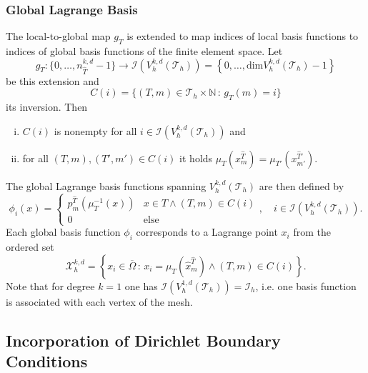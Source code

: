 \documentclass[a4paper,12pt]{article}
\begin{document}
\subsubsection*{Global Lagrange Basis}

The local-to-global map $g_T$ is extended to map indices of 
local basis functions to indices of global basis functions of the finite element space.
Let
\begin{equation*}
g_T : \{0,\ldots,n_{\hat T}^{k,d}-1\} \to \mathcal{I}\left(V_h^{k,d}(\mathcal{T}_h)\right) =
\left\{0,\ldots,\text{dim} V_h^{k,d}(\mathcal{T}_h)-1\right\}
\end{equation*}
be this extension and
\begin{equation*}
C(i) = \{(T,m)\in\mathcal{T}_h\times\mathbb{N} \,:\, g_T(m)=i\}
\end{equation*}
its inversion. Then
\begin{enumerate}[i)]
\item $C(i)$ is nonempty for all $i\in\mathcal{I}\left(V_h^{k,d}(\mathcal{T}_h)\right)$ and
\item for all $(T,m), (T',m') \in C(i)$ it holds $\mu_{T}(x^{\hat T}_m)=\mu_{T'}(x^{\hat T'}_{m'})$.
\end{enumerate}
The global Lagrange basis functions spanning $V_h^{k,d}(\mathcal{T}_h)$ are then defined by
\begin{equation*}
\phi_i(x) = \left\{\begin{array}{ll}
p^{\hat T}_m(\mu_T^{-1}(x)) & x\in T \wedge (T,m)\in C(i) \\
0 & \text{else}
\end{array}\right. , \quad i\in\mathcal{I}\left(V_h^{k,d}(\mathcal{T}_h)\right) .
\end{equation*}
Each global basis function $\phi_i$ corresponds to a Lagrange
point $x_i$ from the ordered set
\begin{equation*}
\mathcal{X}_h^{k,d} = \left\{ x_i\in\overline{\Omega} \,:\,
x_i=\mu_T(\hat x^{\hat T}_{m})  \wedge (T,m)\in C(i) \right\}.
\end{equation*}
Note that for
degree $k=1$ one has $\mathcal{I}\left(V_h^{1,d}(\mathcal{T}_h)\right) = \mathcal{I}_h$, i.e. 
one basis function is associated with each vertex of the mesh.

\subsection{Incorporation of Dirichlet Boundary Conditions}
\label{Sec:Dirichlet}
\end{document}
